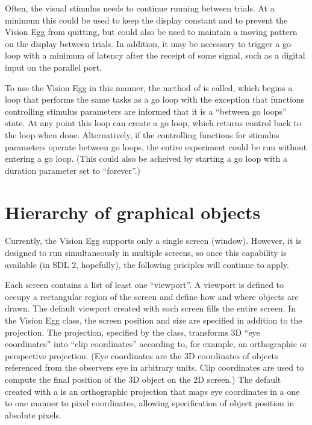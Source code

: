 \documentclass{manual}
\begin{document}
Often, the visual stimulus needs to continue running between trials.
At a minimum this could be used to keep the display constant and to
prevent the Vision Egg from quitting, but could also be used to
maintain a moving pattern on the display between trials.  In addition,
it may be necessary to trigger a go loop with a minimum of latency
after the receipt of some signal, such as a digital input on the
parallel port.

To use the Vision Egg in this manner, the 
method of  is called, which begins a loop that
performs the same tasks as a go loop with the exception that functions
controlling stimulus parameters are informed that it is a ``between go
loops'' state.  At any point this  loop can create
a go loop, which returns control back to the  loop
when done.  Alternatively, if the controlling functions for stimulus
parameters operate between go loops, the entire experiment could be
run without entering a go loop.  (This could also be acheived by
starting a go loop with a duration parameter set to ``forever''.)

\chapter{Hierarchy of graphical objects \label{hierarchy}}

Currently, the Vision Egg supports only a single screen (window).
However, it is designed to run simultaneously in multiple screens, so
once this capability is available (in SDL 2, hopefully), the following
priciples will continue to apply.

Each screen contains a list of least one ``viewport''. A viewport is
defined to occupy a rectangular region of the screen and define how
and where objects are drawn. The default viewport created with each
screen fills the entire screen. In the Vision Egg 
class, the screen position and size are specified in addition to the
projection.  The projection, specified by the 
class, transforms 3D ``eye coordinates'' into ``clip coordinates''
according to, for example, an orthographic or perspective projection.
(Eye coordinates are the 3D coordinates of objects referenced from the
observers eye in arbitrary units.  Clip coordinates are used to
compute the final position of the 3D object on the 2D screen.)  The
default  created with a  is an
orthographic projection that maps eye coordinates in a one to one
manner to pixel coordinates, allowing specification of object position
in absolute pixels.
\end{document}
